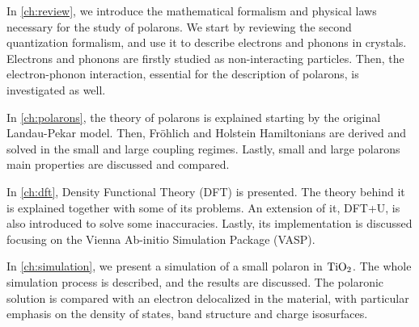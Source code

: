 In \cref{ch:review}, we introduce the mathematical formalism and physical laws necessary for the study of polarons. We start by reviewing the second quantization formalism, and use it to describe electrons and phonons in crystals. Electrons and phonons are firstly studied as non-interacting particles. Then, the electron-phonon interaction, essential for the description of polarons, is investigated as well.

In \cref{ch:polarons}, the theory of polarons is explained starting by the original Landau-Pekar model. Then, Fröhlich and Holstein Hamiltonians are derived and solved in the small and large coupling regimes. Lastly, small and large polarons main properties are discussed and compared.

In \cref{ch:dft}, Density Functional Theory (DFT) is presented. The theory behind it is explained together with some of its problems. An extension of it, DFT+U, is also introduced to solve some inaccuracies. Lastly, its implementation is discussed focusing on the Vienna Ab-initio Simulation Package (VASP).

In \cref{ch:simulation}, we present a simulation of a small polaron in $\ce{TiO_2}$. The whole simulation process is described, and the results are discussed. The polaronic solution is compared with an electron delocalized in the material, with particular emphasis on the density of states, band structure and charge isosurfaces.